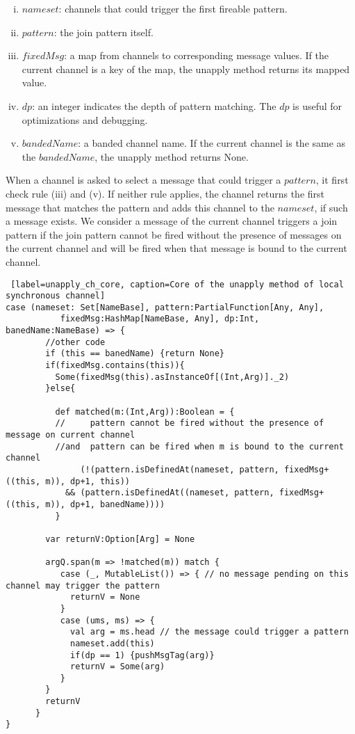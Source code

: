 \begin{enumerate} [(i)]
  \item $nameset$: channels that could trigger the first fireable pattern.
  \item $pattern$: the join pattern itself.
  \item $fixedMsg$: a map from channels to corresponding message values.  If the current channel is a key of the map, the unapply method returns its mapped value.
  \item $dp$: an integer indicates the depth of pattern matching.  The $dp$ is useful for optimizations and debugging.
  \item $bandedName$: a banded channel name.  If the current channel is the same as the $bandedName$, the unapply method returns None.
\end{enumerate}

When a channel is asked to select a message that could trigger a $pattern$, it first check rule (iii) and (v).  If neither rule applies, the channel returns the first message that matches the pattern and adds this channel to the $nameset$, if such a message exists.  We consider a message of the current channel triggers a join pattern if the join pattern cannot be fired without the presence of messages on the current channel and will be fired when that message is bound to the current channel.

\newpage

\begin{lstlisting} [label=unapply_ch_core, caption=Core of the unapply method of local synchronous channel]
case (nameset: Set[NameBase], pattern:PartialFunction[Any, Any], 
           fixedMsg:HashMap[NameBase, Any], dp:Int, banedName:NameBase) => {
        //other code
        if (this == banedName) {return None}      
        if(fixedMsg.contains(this)){
          Some(fixedMsg(this).asInstanceOf[(Int,Arg)]._2)
        }else{
        
          def matched(m:(Int,Arg)):Boolean = {
          //     pattern cannot be fired without the presence of message on current channel  
          //and  pattern can be fired when m is bound to the current channel 
               (!(pattern.isDefinedAt(nameset, pattern, fixedMsg+((this, m)), dp+1, this))
            && (pattern.isDefinedAt((nameset, pattern, fixedMsg+((this, m)), dp+1, banedName))))
          }
                
        var returnV:Option[Arg] = None

        argQ.span(m => !matched(m)) match {
           case (_, MutableList()) => { // no message pending on this channel may trigger the pattern
             returnV = None
           }
           case (ums, ms) => {
             val arg = ms.head // the message could trigger a pattern
             nameset.add(this)
             if(dp == 1) {pushMsgTag(arg)}
             returnV = Some(arg)
           }
        }
        returnV
      }
}
\end{lstlisting}

